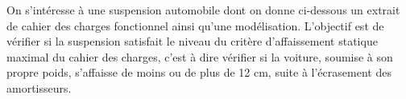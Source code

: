 % 
%
%
%
%
%



On s'intéresse à une suspension automobile dont on donne ci-dessous un extrait de cahier des charges fonctionnel ainsi qu’une modélisation. L'objectif est de vérifier si la suspension satisfait le niveau du critère d'affaissement statique maximal du cahier des charges, c'est à dire vérifier si la voiture, soumise à son propre poids, s'affaisse de moins ou de plus de 12 cm, suite à l'écrasement des amortisseurs. 


%
%
%
%
%

\ifcolle
{}
\else
\fi

